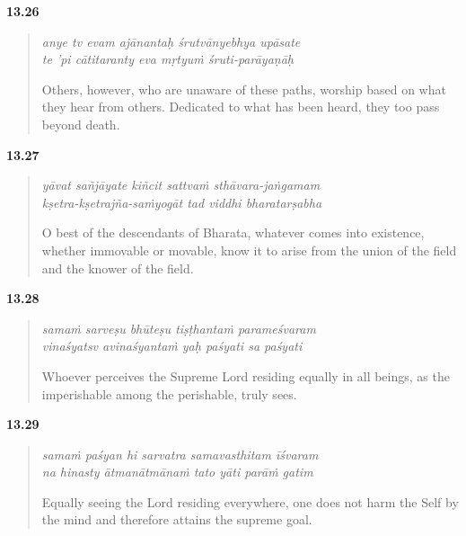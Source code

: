 \par\noindent\textbf{13.26}\par
\begin{verse}
\textit{anye tv evam ajānantaḥ śrutvānyebhya upāsate} \\
\textit{te ’pi cātitaranty eva mṛtyuṁ śruti-parāyaṇāḥ}

\noindent Others, however, who are unaware of these paths, worship based on what they hear from others. Dedicated to what has been heard, they too pass beyond death.
\end{verse}
\par



\par\noindent\textbf{13.27}\par
\begin{verse}
\textit{yāvat sañjāyate kiñcit sattvaṁ sthāvara-jaṅgamam} \\
\textit{kṣetra-kṣetrajña-saṁyogāt tad viddhi bharatarṣabha}

\noindent O best of the descendants of Bharata, whatever comes into existence, whether immovable or movable, know it to arise from the union of the field and the knower of the field.
\end{verse}
\par



\par\noindent\textbf{13.28}\par
\begin{verse}
\textit{samaṁ sarveṣu bhūteṣu tiṣṭhantaṁ parameśvaram} \\
\textit{vinaśyatsv avinaśyantaṁ yaḥ paśyati sa paśyati}

\noindent Whoever perceives the Supreme Lord residing equally in all beings, as the imperishable among the perishable, truly sees.
\end{verse}
\par



\par\noindent\textbf{13.29}\par
\begin{verse}
\textit{samaṁ paśyan hi sarvatra samavasthitam īśvaram} \\
\textit{na hinasty ātmanātmānaṁ tato yāti parāṁ gatim}

\noindent Equally seeing the Lord residing everywhere, one does not harm the Self by the mind and therefore attains the supreme goal.
\end{verse}
\par



